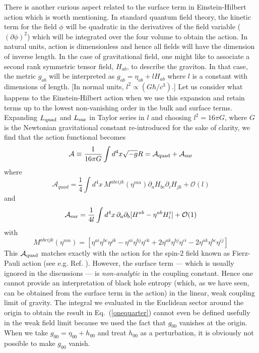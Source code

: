\documentclass[12pt]{iopart}
\def\eq#1{{Eq.~(\ref{#1})}}
\begin{document}
There is another curious aspect related to the surface term in Einstein-Hilbert action which is worth mentioning. In standard quantum field theory, the kinetic term for the field
$\phi$ will be quadratic in the derivatives of the field variable ($(\partial \phi)^2$) which will be integrated over the four volume to obtain the action. In natural units,
action is dimensionless and hence all fields will have the dimension of inverse length.
In the case of gravitational field, one might like to associate a second rank symmetric tensor field, $H_{ab}$,  to describe the graviton. In that case, the metric $g_{ab}$ will be interpreted as $g_{a b} = \eta_{ab}+l H_{ab}$ where $l$  is a constant with dimensions 
of length. [In normal units, $l^2 \propto (G\hbar/c^3)$.] Let us consider 
what happens to the Einstein-Hilbert action when we use this expansion and retain terms  up to the lowest non-vanishing order in the bulk and surface terms. 
Expanding $L_{\rm quad}$ and $L_{\rm sur}$ in Taylor series in $l$ and choosing   
 $l^2 = 16\pi G$, where $G$ is the Newtonian gravitational constant re-introduced for the sake of clarity, 
we find that the action functional becomes
\begin{equation}
\mathcal{A}\equiv  \frac{1}{16\pi G} \int d^4 x \sqrt{-g} R = \mathcal{A}_{\rm quad} + \mathcal{A}_{\rm sur}
\end{equation} 
where 
\begin{equation}
\mathcal{A}_{quad}=\frac{1}{4} \int d^4x\,   M^{abcijk}(\eta^{mn})\partial_a H_{bc}\partial_i H_{jk} 
+ \mathcal{O}(l)
\end{equation} 
and 
\begin{equation}
\mathcal{A}_{\rm sur}=
\frac{1}{4l}\int d^4x\,  \partial_a \partial_b[H^{ab}-\eta^{ab}H^i_i]+ \mathcal{O}(1)
\label{leading}
\end{equation}
with 
\begin{equation}
M^{abcijk}(\eta^{mn}) = \left[\eta^{ai} \eta^{bc}\eta^{jk}
 -\eta^{ai}\eta^{bj}\eta^{ck}
+2 \eta^{ak}\eta^{bj}\eta^{ci}
 -2\eta^{ak}\eta^{bc}\eta^{ij}\right]
 \label{formofmapp}
\end{equation}
This $\mathcal{A}_{\rm quad}$ matches exactly with the action for the spin-2 field
known as Fierz-Pauli action (see e.g. Ref. \cite{tpgraviton}). However, the surface term --- which is usually ignored in the discussions --- 
is \textit{non-analytic}
in the coupling constant. Hence
 one cannot provide an interpretation of black hole entropy 
(which, as we have seen, can be obtained from the surface term in the action)
in the linear, weak coupling limit of gravity. 
The integral we evaluated in the Euclidean sector around the origin to obtain
the result in \eq{onequarter} cannot even be defined usefully in the weak field limit
 because we used the fact that $g_{00}$ vanishes at the origin. When we take $g_{00}= \eta_{00}+h_{00}$ and treat $h_{00}$ as a  perturbation, it is obviously not possible 
to make $g_{00}$ vanish.
\end{document}
